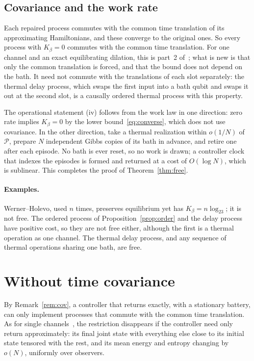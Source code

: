 \documentclass[11pt]{article}
\theoremstyle{definition}
\theoremstyle{remark}
\newcommand{\Kb}{K_\beta}
\newcommand{\Pp}{\mathcal P}
\begin{document}
\subsection{Covariance and the work rate}

Each repaired process commutes with the common time translation of its approximating Hamiltonians, and these converge to the original ones. So every process with $\Kb=0$ commutes with the common time translation. For one channel and an exact equilibrating dilation, this is part~2 of~\cite[Prop.~4]{LieEtAl26}; what is new is that only the common translation is forced, and that the bound does not depend on the bath. It need not commute with the translations of each slot separately: the thermal delay process, which swaps the first input into a bath qubit and swaps it out at the second slot, is a causally ordered thermal process with this property.

The operational statement (iv) follows from the work law in one direction: zero rate implies $\Kb=0$ by the lower bound~\eqref{eq:converse}, which does not use covariance. In the other direction, take a thermal realization within $o(1/N)$ of $\Pp$, prepare $N$ independent Gibbs copies of its bath in advance, and retire one after each episode. No bath is ever reset, so no work is drawn; a controller clock that indexes the episodes is formed and returned at a cost of $O(\log N)$, which is sublinear. This completes the proof of Theorem~\ref{thm:free}.

\paragraph{Examples.} Werner--Holevo, used $n$ times, preserves equilibrium yet has $\Kb=n\log_23$; it is not free. The ordered process of Proposition~\ref{prop:order} and the delay process have positive cost, so they are not free either, although the first is a thermal operation as one channel. The thermal delay process, and any sequence of thermal operations sharing one bath, are free.

\section{Without time covariance}\label{sec:noncov}

By Remark~\ref{rem:cov}, a controller that returns exactly, with a stationary battery, can only implement processes that commute with the common time translation. As for single channels~\cite{SaveWork}, the restriction disappears if the controller need only return approximately: its final joint state with everything else close to its initial state tensored with the rest, and its mean energy and entropy changing by $o(N)$, uniformly over observers.
\end{document}
